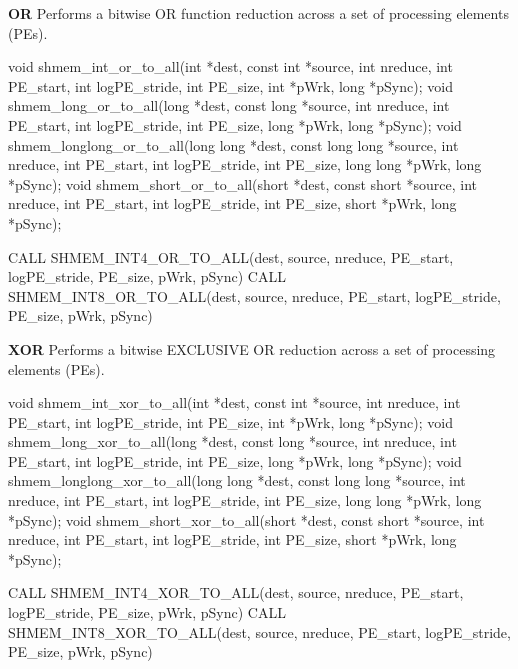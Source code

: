 \begin{apidefinition}
\bigskip
\textbf{OR} \newline
Performs  a  bitwise  OR  function reduction across a set of processing elements (\ac{PE}s).\newline
\begin{Csynopsis}
void shmem_int_or_to_all(int *dest, const int *source, int nreduce, int PE_start, int logPE_stride, int PE_size, int *pWrk, long *pSync);
void shmem_long_or_to_all(long *dest, const long *source, int nreduce, int PE_start, int logPE_stride, int PE_size, long *pWrk, long *pSync);
void shmem_longlong_or_to_all(long long *dest, const long long *source, int nreduce, int PE_start, int logPE_stride, int PE_size, long long *pWrk, long *pSync);
void shmem_short_or_to_all(short *dest, const short *source, int nreduce, int PE_start, int logPE_stride, int PE_size, short *pWrk, long *pSync);
\end{Csynopsis}

\begin{Fsynopsis}
CALL SHMEM_INT4_OR_TO_ALL(dest, source, nreduce, PE_start, logPE_stride, PE_size, pWrk, pSync)
CALL SHMEM_INT8_OR_TO_ALL(dest, source, nreduce, PE_start, logPE_stride, PE_size, pWrk, pSync)	
\end{Fsynopsis}

\bigskip
\textbf{XOR}\newline
Performs  a  bitwise  EXCLUSIVE OR reduction across a set of processing elements (\ac{PE}s).\newline
\begin{Csynopsis}
void shmem_int_xor_to_all(int *dest, const int *source, int nreduce, int PE_start, int logPE_stride, int PE_size, int *pWrk, long *pSync);
void shmem_long_xor_to_all(long *dest, const long *source, int nreduce, int PE_start, int logPE_stride, int PE_size, long *pWrk, long *pSync);
void shmem_longlong_xor_to_all(long long *dest, const long long *source, int nreduce, int PE_start, int logPE_stride, int PE_size, long long *pWrk, long *pSync);
void shmem_short_xor_to_all(short *dest, const short *source, int nreduce, int PE_start, int logPE_stride, int PE_size, short *pWrk, long *pSync);
\end{Csynopsis}

\begin{Fsynopsis}
CALL SHMEM_INT4_XOR_TO_ALL(dest, source, nreduce, PE_start, logPE_stride, PE_size, pWrk, pSync)
CALL SHMEM_INT8_XOR_TO_ALL(dest, source, nreduce, PE_start, logPE_stride, PE_size, pWrk, pSync)
\end{Fsynopsis}


\end{apidefinition}
